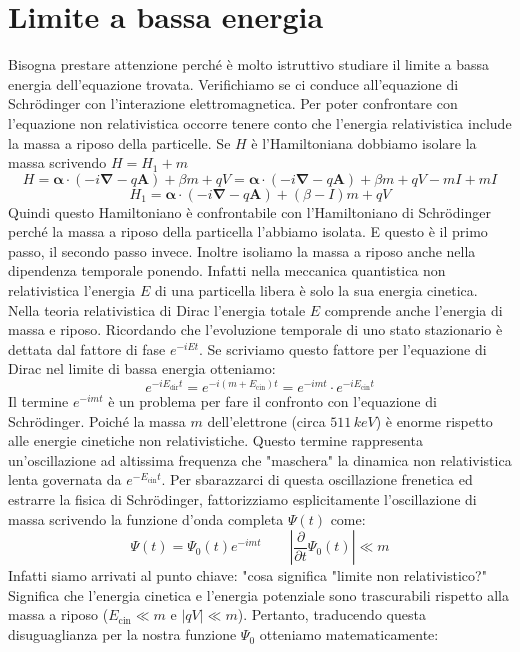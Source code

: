 \section{Limite a bassa energia}
Bisogna prestare attenzione perché è molto istruttivo studiare il limite a bassa energia dell'equazione trovata. Verifichiamo se ci conduce all'equazione di Schr\"odinger con l'interazione elettromagnetica. Per poter confrontare con l'equazione non relativistica occorre tenere conto che l'energia relativistica include la massa a riposo della particelle. Se $H$ è l'Hamiltoniana dobbiamo isolare la massa scrivendo $H=H_1+m$
$$
H = \boldsymbol{\alpha} \cdot (-i\boldsymbol{\nabla} - q\mathbf{A}) + \beta m + qV = \boldsymbol{\alpha} \cdot (-i\boldsymbol{\nabla} - q\mathbf{A}) + \beta m + qV - mI + mI
$$
$$
H_1 = \boldsymbol{\alpha} \cdot (-i\boldsymbol{\nabla} - q\mathbf{A}) + (\beta - I)m + qV
$$
Quindi questo Hamiltoniano è confrontabile con l'Hamiltoniano di Schr\"odinger perché la massa a riposo della particella l'abbiamo isolata. E questo è il primo passo, il secondo passo invece. Inoltre isoliamo la massa a riposo anche nella dipendenza temporale ponendo. Infatti nella meccanica quantistica non relativistica l'energia $E$ di una particella libera è solo la sua energia cinetica. Nella teoria relativistica di Dirac l'energia totale $E$ comprende anche l'energia di massa e riposo. Ricordando che l'evoluzione temporale di uno stato stazionario è dettata dal fattore di fase $e^{-iEt}$. Se scriviamo questo fattore per l'equazione di Dirac nel limite di bassa energia otteniamo:
$$
e^{-iE_\text{dir}t}=e^{-i(m+E_\text{cin})t}=e^{-imt}\cdot e^{-iE_\text{cin}t}
$$
Il termine $e^{-imt}$ è un problema per fare il confronto con l'equazione di Schr\"odinger. Poiché la massa $m$ dell'elettrone (circa $511\,\unit{keV}$) è enorme rispetto alle energie cinetiche non relativistiche. Questo termine rappresenta un'oscillazione ad altissima frequenza che "maschera" la dinamica non relativistica lenta governata da $e^{-E_\text{cin}t}$. Per sbarazzarci di questa oscillazione frenetica ed estrarre la fisica di Schr\"odinger, fattorizziamo esplicitamente l'oscillazione di massa scrivendo la funzione d'onda completa $\Psi(t)$ come:
$$
\Psi(t) = \Psi_0(t) e^{-imt} \qquad \left| \frac{\partial}{\partial t} \Psi_0(t) \right| \ll m
$$
Infatti siamo arrivati al punto chiave: "cosa significa "limite non relativistico?" Significa che l'energia cinetica e l'energia potenziale sono trascurabili rispetto alla massa a riposo ($E_\text{cin}\ll m$ e $|qV|\ll m$). Pertanto, traducendo questa disuguaglianza per la nostra funzione $\Psi_0$ otteniamo matematicamente:
